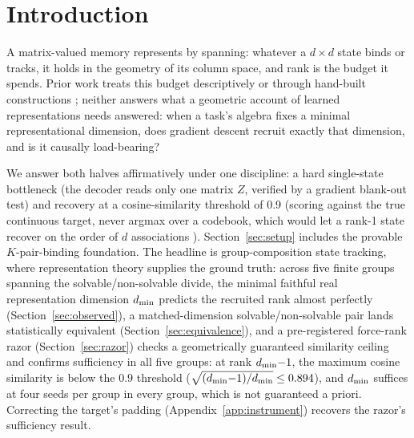 \section{Introduction}
\label{sec:intro}

A matrix-valued memory represents by spanning: whatever a $d \times d$
state binds or tracks, it holds in the geometry of its column space, and
rank is the budget it spends. Prior work treats this budget
descriptively \citep{nazari2026rank, sun2026staterank} or through
hand-built constructions \citep{nichani2025factual}; neither answers
what a geometric account of learned representations needs answered:
when a task's algebra fixes a minimal representational dimension, does
gradient descent recruit exactly that dimension, and is it causally
load-bearing?

We answer both halves affirmatively under one discipline: a hard
single-state bottleneck (the decoder reads only one matrix $Z$, verified
by a gradient blank-out test) and recovery at a cosine-similarity
threshold of 0.9 (scoring against the true continuous target, never argmax over a codebook,
which would let a rank-1 state recover on the order of $d$ associations
\citep{nichani2025factual}). Section~\ref{sec:setup} includes the
provable $K$-pair-binding foundation. The headline is
group-composition state tracking, where representation theory
supplies the ground truth: across five finite groups spanning the
solvable/non-solvable divide, the minimal faithful real representation
dimension $d_{\min}$ predicts the recruited rank almost perfectly
(Section~\ref{sec:observed}), a
matched-dimension solvable/non-solvable pair lands statistically
equivalent (Section~\ref{sec:equivalence}),
and a pre-registered force-rank
razor (Section~\ref{sec:razor}) checks a geometrically guaranteed
similarity ceiling and confirms sufficiency in all five groups:
at rank $d_{\min}{-}1$, the maximum cosine similarity is below the $0.9$ threshold
($\sqrt{(d_{\min}{-}1)/d_{\min}} \le 0.894$), and $d_{\min}$ suffices at four
seeds per group in every group, which is not guaranteed a priori.
Correcting the target's padding (Appendix~\ref{app:instrument}) recovers the
razor's sufficiency result.

